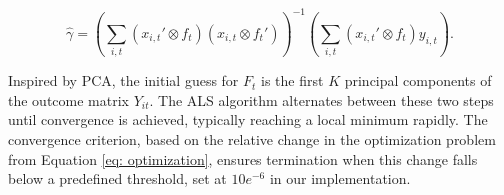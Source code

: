 \documentclass[12pt]{article}
\begin{document}
\begin{equation*}
\hat{\gamma} = \left( \sum_{i,t} (x_{i,t}' \otimes f_t) (x_{i,t} \otimes f_t') \right)^{-1} \left( \sum_{i,t} (x_{i,t}' \otimes f_t) y_{i,t} \right).
\end{equation*}

Inspired by PCA, the initial guess for $F_t$ is the first $K$ principal components of the outcome matrix $Y_{it}$. The ALS algorithm alternates between these two steps until convergence is achieved, typically reaching a local minimum rapidly. The convergence criterion, based on the relative change in the optimization problem from Equation \ref{eq: optimization}, ensures termination when this change falls below a predefined threshold, set at $10e^{-6}$ in our implementation.
\end{document}
